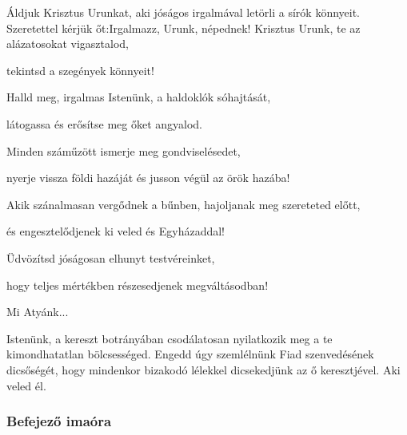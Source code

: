 \documentclass[twoside]{article}
\begin{document}
\begin{preces}{Áldjuk Krisztus Urunkat, aki jóságos irgalmával letörli a sírók könnyeit. Szeretettel kérjük őt:}{Irgalmazz, Urunk, népednek!}
  Krisztus Urunk, te az alázatosokat vigasztalod,

  \reddash tekintsd a szegények könnyeit!

  Halld meg, irgalmas Istenünk, a haldoklók sóhajtását,

  \reddash látogassa és erősítse meg őket angyalod.

  Minden száműzött ismerje meg gondviselésedet,

  \reddash nyerje vissza földi hazáját és jusson végül az örök hazába!

  Akik szánalmasan vergődnek a bűnben, hajoljanak meg szereteted előtt,

  \reddash és engesztelődjenek ki veled és Egyházaddal!

  Üdvözítsd jóságosan elhunyt testvéreinket,

  \reddash hogy teljes mértékben részesedjenek megváltásodban!
\end{preces}
Mi Atyánk...

Istenünk, a kereszt botrányában csodálatosan nyilatkozik meg a te kimondhatatlan bölcsességed. Engedd úgy szemlélnünk Fiad szenvedésének dicsőségét, hogy mindenkor bizakodó lélekkel dicsekedjünk az ő keresztjével. Aki veled él.

\subsubsection*{Befejező imaóra}
\end{document}
